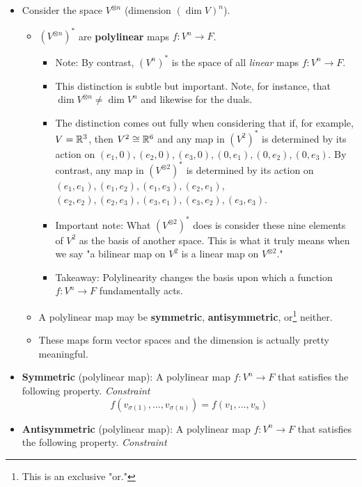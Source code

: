 \documentclass[../notes.tex]{subfiles}
\begin{document}
\begin{itemize}
\begin{itemize}
    \end{itemize}
    \item Consider the space $V^{\otimes n}$ (dimension $(\dim V)^n$).
    \begin{itemize}
        \item $(V^{\otimes n})^*$ are \textbf{polylinear} maps $f:V^n\to F$.
        \begin{itemize}
            \item Note: By contrast, $(V^n)^*$ is the space of all \emph{linear} maps $f:V^n\to F$.
            \item This distinction is subtle but important. Note, for instance, that $\dim V^{\otimes n}\neq\dim V^n$ and likewise for the duals.
            \item The distinction comes out fully when considering that if, for example, $V=\mathbb{R}^3$, then $V^2\cong\mathbb{R}^6$ and any map in $(V^2)^*$ is determined by its action on $(e_1,0),(e_2,0),(e_3,0),(0,e_1),(0,e_2),(0,e_3)$. By contrast, any map in $(V^{\otimes 2})^*$ is determined by its action on $(e_1,e_1),(e_1,e_2),(e_1,e_3),(e_2,e_1)$, $(e_2,e_2),(e_2,e_3),(e_3,e_1),(e_3,e_2),(e_3,e_3)$.
            \item Important note: What $(V^{\otimes 2})^*$ does is consider these nine elements of $V^2$ as the basis of another space. This is what it truly means when we say "a bilinear map on $V^2$ is a linear map on $V^{\otimes 2}$."
            \item Takeaway: Polylinearity changes the basis upon which a function $f:V^n\to F$ fundamentally acts.
        \end{itemize}
        \item A polylinear map may be \textbf{symmetric}, \textbf{antisymmetric}, or\footnote{This is an exclusive "or."} neither.
        \item These maps form vector spaces and the dimension is actually pretty meaningful.
    \end{itemize}
    \item \textbf{Symmetric} (polylinear map): A polylinear map $f:V^n\to F$ that satisfies the following property. \emph{Constraint}
    \begin{equation*}
        f(v_{\sigma(1)},\dots,v_{\sigma(n)}) = f(v_1,\dots,v_n)
    \end{equation*}
    \item \textbf{Antisymmetric} (polylinear map): A polylinear map $f:V^n\to F$ that satisfies the following property. \emph{Constraint}
    \begin{equation*}

\end{equation*}
\end{itemize}
\end{document}
